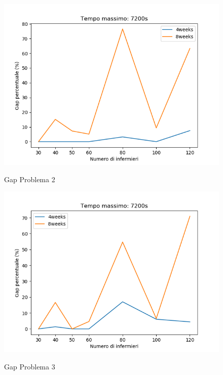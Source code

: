 \begin{figure}[H]
\begin{center}
  \includegraphics[scale=0.5]{img/Problema2/Gap_2h-h0_w4.png}\\
  \caption{Gap Problema 2}
\end{center}
\end{figure}

\begin{figure}[H]
\begin{center}
  \includegraphics[scale=0.5]{img/Problema3/Gap_2h-h1_w0.png}\\
  \caption{Gap Problema 3}
\end{center}
\end{figure}

